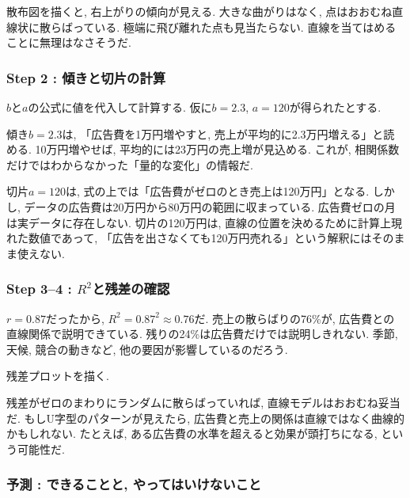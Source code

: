 
散布図を描くと, 右上がりの傾向が見える.
大きな曲がりはなく, 点はおおむね直線状に散らばっている.
極端に飛び離れた点も見当たらない.
直線を当てはめることに無理はなさそうだ.

\subsubsection*{Step 2 : 傾きと切片の計算}


$b$と$a$の公式に値を代入して計算する.
仮に$b = 2.3$, $a = 120$が得られたとする.


傾き$b = 2.3$は, 「広告費を1万円増やすと, 売上が平均的に2.3万円増える」と読める.
10万円増やせば, 平均的には23万円の売上増が見込める.
これが, 相関係数だけではわからなかった「量的な変化」の情報だ.

切片$a = 120$は, 式の上では「広告費がゼロのとき売上は120万円」となる.
しかし, データの広告費は20万円から80万円の範囲に収まっている.
広告費ゼロの月は実データに存在しない.
切片の120万円は, 直線の位置を決めるために計算上現れた数値であって, 「広告を出さなくても120万円売れる」という解釈にはそのまま使えない.

\subsubsection*{Step 3--4 : $R^2$と残差の確認}

$r = 0.87$だったから, $R^2 = 0.87^2 \approx 0.76$だ.
売上の散らばりの76\%が, 広告費との直線関係で説明できている.
残りの24\%は広告費だけでは説明しきれない.
季節, 天候, 競合の動きなど, 他の要因が影響しているのだろう.

残差プロットを描く.


残差がゼロのまわりにランダムに散らばっていれば, 直線モデルはおおむね妥当だ.
もしU字型のパターンが見えたら, 広告費と売上の関係は直線ではなく曲線的かもしれない.
たとえば, ある広告費の水準を超えると効果が頭打ちになる, という可能性だ.

\subsubsection*{予測 : できることと, やってはいけないこと}


